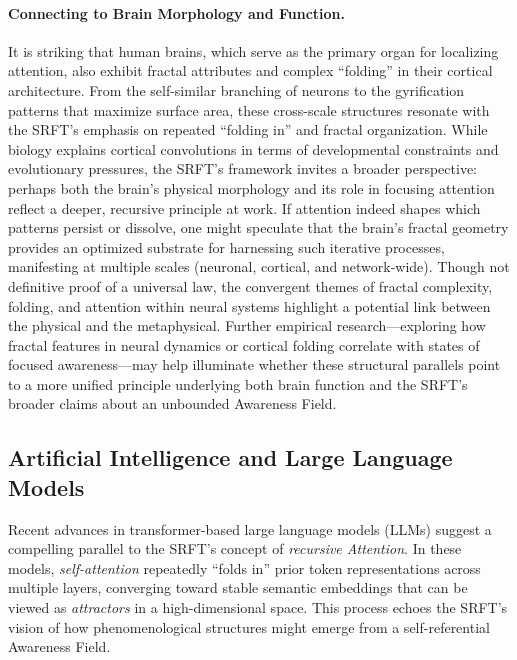 \documentclass[12pt,a4paper]{article}
\begin{document}
\paragraph{Connecting to Brain Morphology and Function.} It is striking that human brains, which serve as the primary organ for localizing attention, also exhibit fractal attributes and complex “folding” in their cortical architecture. From the self-similar branching of neurons to the gyrification patterns that maximize surface area, these cross-scale structures resonate with the SRFT’s emphasis on repeated “folding in” and fractal organization. While biology explains cortical convolutions in terms of developmental constraints and evolutionary pressures, the SRFT’s framework invites a broader perspective: perhaps both the brain’s physical morphology and its role in focusing attention reflect a deeper, recursive principle at work. If attention indeed shapes which patterns persist or dissolve, one might speculate that the brain’s fractal geometry provides an optimized substrate for harnessing such iterative processes, manifesting at multiple scales (neuronal, cortical, and network-wide). Though not definitive proof of a universal law, the convergent themes of fractal complexity, folding, and attention within neural systems highlight a potential link between the physical and the metaphysical. Further empirical research—exploring how fractal features in neural dynamics or cortical folding correlate with states of focused awareness—may help illuminate whether these structural parallels point to a more unified principle underlying both brain function and the SRFT’s broader claims about an unbounded Awareness Field.

\subsection{Artificial Intelligence and Large Language Models}
\label{subsec:ai-llms}

Recent advances in transformer-based large language models (LLMs) \cite{Vaswani2017, Devlin2019, Brown2020} suggest a compelling parallel to the SRFT’s concept of \emph{recursive Attention}. In these models, \emph{self-attention} repeatedly “folds in” prior token representations across multiple layers, converging toward stable semantic embeddings that can be viewed as \emph{attractors} in a high-dimensional space. This process echoes the SRFT’s vision of how phenomenological structures might emerge from a self-referential Awareness Field.
\end{document}
